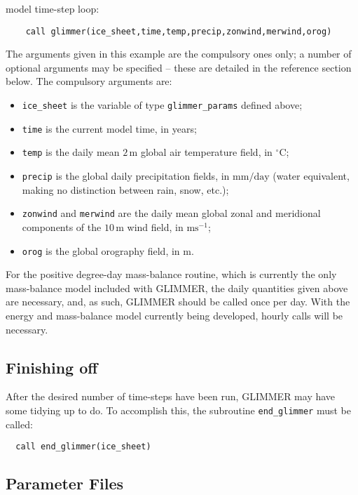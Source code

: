 model time-step loop:
%
\begin{verbatim}
    call glimmer(ice_sheet,time,temp,precip,zonwind,merwind,orog)
\end{verbatim} 
%
The arguments given in this example are the compulsory ones only; a number of
optional arguments may be specified -- these are detailed in the reference
section below. The compulsory arguments are:
%
\begin{itemize}
\item \texttt{ice\_sheet} is the variable of type \texttt{glimmer\_params}
 defined above;
\item \texttt{time} is the current model time, in years;
\item \texttt{temp} is the daily mean $2\,\mathrm{m}$ global air temperature field, in
  $^{\circ}\mathrm{C}$;
\item \texttt{precip} is the global daily precipitation fields,
  in $\mathrm{mm}/\mathrm{day}$ (water equivalent, making no distinction
  between rain, snow, etc.);
\item \texttt{zonwind} and \texttt{merwind} are the daily mean global zonal and
  meridional components of the $10\,\mathrm{m}$ wind field, in
  $\mathrm{ms}^{-1}$;
\item \texttt{orog} is the global orography field, in $\mathrm{m}$.
\end{itemize}
%
For the positive degree-day mass-balance routine, which is currently the only
mass-balance model included with GLIMMER, the daily quantities given above are
necessary, and, as such, GLIMMER should be called once per day. With the
energy and mass-balance model currently being developed, hourly calls will be
necessary. 
%
\subsection{Finishing off}
%
After the desired number of time-steps have been run, GLIMMER may have some
tidying up to do. To accomplish this, the subroutine \texttt{end\_glimmer}
must be called:
%
\begin{verbatim}
  call end_glimmer(ice_sheet)
\end{verbatim}
%

\subsection{Parameter Files}
